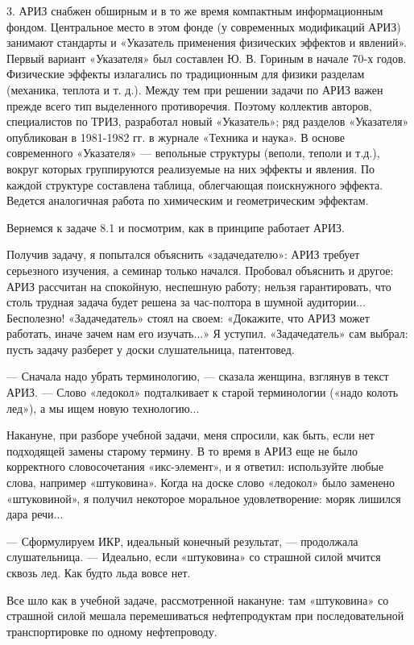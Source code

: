3. АРИЗ  снабжен обширным  и в то  же время  компактным информационным
фондом.  Центральное место  в  этом фонде  (у современных  модификаций
АРИЗ) занимают стандарты и «Указатель применения физических эффектов и
явлений». Первый  вариант «Указателя»  был составлен  Ю. В.  Гориным в
начале 70-х  годов. Физические эффекты излагались  по традиционным для
физики разделам  (механика, теплота  и т. д.).  Между тем  при решении
задачи  по  АРИЗ  важен  прежде всего  тип  выделенного  противоречия.
Поэтому  коллектив авторов,  специалистов  по  ТРИЗ, разработал  новый
«Указатель»;  ряд разделов  «Указателя»  опубликован  в 1981-1982  гг.
в  журнале  «Техника  и  наука».  В  основе  современного  «Указателя»
—  вепольные  структуры  (веполи,   теполи  и  т.д.),  вокруг  которых
группируются реализуемые на них эффекты и явления. По каждой структуре
составлена   таблица,   облегчающая  поискнужного   эффекта.   Ведется
аналогичная работа по химическим и геометрическим эффектам.


Вернемся к задаче 8.1 и посмотрим, как в принципе работает АРИЗ.

Получив  задачу, я  попытался объяснить  «задачедателю»: АРИЗ  требует
серьезного  изучения, а  семинар  только  начался. Пробовал  объяснить
и  другое:  АРИЗ  рассчитан  на спокойную,  неспешную  работу;  нельзя
гарантировать, что  столь трудная  задача будет решена  за час-полтора
в  шумной  аудитории...  Бесполезно! «Задачедатель»  стоял  на  своем:
«Докажите, что АРИЗ может работать,  иначе зачем нам его изучать...» Я
уступил.  «Задачедатель» сам  выбрал:  пусть задачу  разберет у  доски
слушательница, патентовед.

—  Сначала надо  убрать терминологию,  — сказала  женщина, взглянув  в
текст  АРИЗ.  — Слово  «ледокол»  подталкивает  к старой  терминологии
(«надо колоть лед»), а мы ищем новую технологию...

Накануне, при  разборе учебной задачи,  меня спросили, как  быть, если
нет подходящей замены  старому термину. В то время в  АРИЗ еще не было
корректного  словосочетания «икс-элемент»,  и  я ответил:  используйте
любые слова, например «штуковина». Когда на доске слово «ледокол» было
заменено «штуковиной»,  я получил некоторое  моральное удовлетворение:
моряк лишился дара речи...

—  Сформулируем  ИКР,  идеальный   конечный  результат,  —  продолжала
слушательница. —  Идеально, если «штуковина» со  страшной силой мчится
сквозь лед. Как будто льда вовсе нет.

Все   шло  как   в   учебной  задаче,   рассмотренной  накануне:   там
«штуковина» со страшной силой мешала перемешиваться нефтепродуктам при
последовательной транспортировке по одному нефтепроводу.

